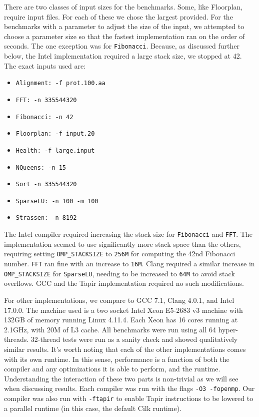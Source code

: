 \documentclass[sigconf]{acmart}
\begin{document}
There are two classes of input sizes for the benchmarks. Some, like Floorplan,
require input files. For each of these we chose the largest provided. For the
benchmarks with a parameter to adjust the size of the input, we attempted to
choose a parameter size so that the fastest implementation ran on the order of
seconds. The one exception was for \texttt{Fibonacci}. Because, as discussed
further below, the Intel implementation required a large stack size, we stopped at
42. The exact inputs used are:

\begin{itemize}
\item \texttt{Alignment: -f prot.100.aa}
\item \texttt{FFT: -n 335544320}
\item \texttt{Fibonacci: -n 42}
\item \texttt{Floorplan: -f input.20}
\item \texttt{Health: -f large.input}
\item \texttt{NQueens: -n 15}
\item \texttt{Sort -n 335544320}
\item \texttt{SparseLU: -n 100 -m 100}
\item \texttt{Strassen: -n 8192}
\end{itemize}

The Intel compiler required increasing the stack size for \texttt{Fibonacci} and
\texttt{FFT}. The implementation seemed to use significantly more stack space
than the others, requiring setting \texttt{OMP\_STACKSIZE} to \texttt{256M} for
computing the 42nd Fibonacci number. \texttt{FFT} ran fine with an increase to
\texttt{16M}. Clang required a similar increase in \texttt{OMP\_STACKSIZE} for
\texttt{SparseLU}, needing to be increased to \texttt{64M} to avoid stack
overflows. GCC and the Tapir implementation required no such modifications.

For other implementations, we compare to GCC 7.1, Clang 4.0.1, and Intel
17.0.0. The machine used is a two socket Intel Xeon E5-2683 v3 machine with
132GB of memory running Linux 4.11.4. Each Xeon has 16 cores running at
2.1GHz, with 20M of L3 cache. All benchmarks were run using all 64
hyper-threads. 32-thread tests were run as a sanity check and showed
qualitatively similar results. It's worth noting that each of the other
implementations comes with its own runtime. In this sense, performance is a
function of both the compiler and any optimizations it is able to perform, and
the runtime.  Understanding the interaction of these two parts is non-trivial
as we will see when discussing results. Each compiler was run with the flags
\texttt{-O3 -fopenmp}. Our compiler was also run with \texttt{-ftapir} to
enable Tapir instructions to be lowered to a parallel runtime (in this case,
the default Cilk runtime).
\end{document}
